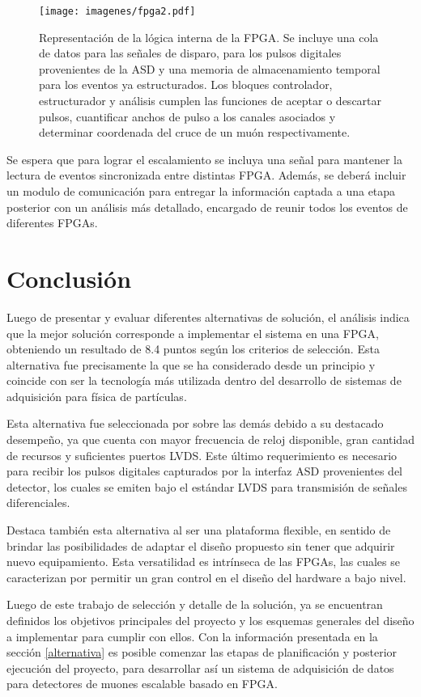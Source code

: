 \begin{figure}[H]
	\centering
	\texttt{[image: imagenes/fpga2.pdf]}
	\caption{Representación de la lógica interna de la FPGA. Se incluye una cola de datos para las señales de disparo, para los pulsos digitales provenientes de la ASD y una memoria de almacenamiento temporal para los eventos ya estructurados. Los bloques controlador, estructurador y análisis cumplen las funciones de aceptar o descartar pulsos, cuantificar anchos de pulso a  los canales asociados y determinar coordenada del cruce de un muón respectivamente.}
	\label{fig:fpga2}
\end{figure}

\par Se espera que para lograr el escalamiento se incluya una señal para mantener la lectura de eventos sincronizada entre distintas FPGA. Además, se deberá incluir un modulo de comunicación para entregar la información captada a una etapa posterior con un análisis más detallado, encargado de reunir todos los eventos de diferentes FPGAs.


\newpage
\section{Conclusión}
\par Luego de presentar y evaluar diferentes alternativas de solución, el análisis indica que la mejor solución corresponde a implementar el sistema en una FPGA, obteniendo un resultado de 8.4 puntos según los criterios de selección. Esta alternativa fue precisamente la que se ha considerado desde un principio y coincide con ser la tecnología más utilizada dentro del desarrollo de sistemas de adquisición para física de partículas\cite{Basiladze2017Methods1}\cite{Basiladze2017Methods2}.
\par Esta alternativa fue seleccionada por sobre las demás debido a su destacado desempeño, ya que cuenta con mayor frecuencia de reloj disponible, gran cantidad de recursos y suficientes puertos LVDS. Este último requerimiento es necesario para recibir los pulsos digitales capturados por la interfaz ASD provenientes del detector, los cuales se emiten bajo el estándar LVDS para transmisión de señales diferenciales.
\par Destaca también esta alternativa al ser una plataforma flexible, en sentido de brindar las posibilidades de adaptar el diseño propuesto sin tener que adquirir nuevo equipamiento. Esta versatilidad es intrínseca de las FPGAs, las cuales se caracterizan por permitir un gran control en el diseño del hardware a bajo nivel.
\par Luego de este trabajo de selección y detalle de la solución, ya se encuentran definidos los objetivos principales del proyecto y los esquemas generales del diseño a implementar para cumplir con ellos. Con la información presentada en la sección \ref{alternativa} es posible comenzar las etapas de planificación y posterior ejecución del proyecto, para desarrollar así un sistema de adquisición de datos para detectores de muones escalable basado en FPGA.

